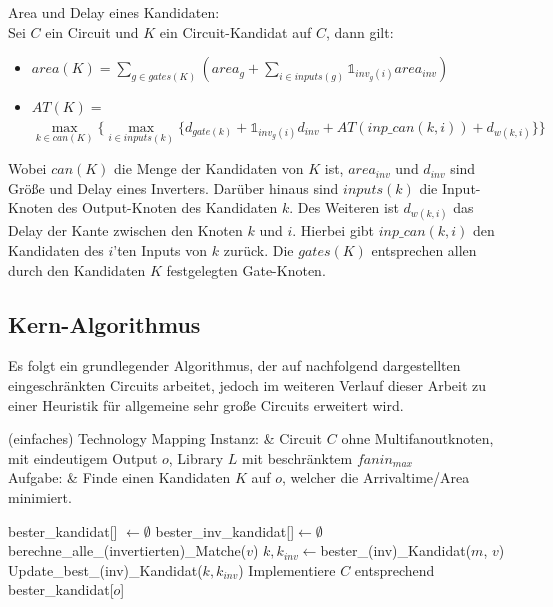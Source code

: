 \documentclass[11pt, a4paper, german]{article}
\begin{document}
\begin{definition}{Area und Delay eines Kandidaten:}\\
\label{def:area_delay}
Sei $C$ ein Circuit und $K$ ein Circuit-Kandidat auf $C$, dann gilt: \\
\begin{itemize}
\item $area(K) = \sum_{g \in gates(K)} (area_g + \sum_{i \in inputs(g)} \mathbb{1}_{inv_g(i)} area_{inv})$ 
\item $AT(K) = $\\$  \max\limits_{k \in can(K)} \{\max\limits_{i \in inputs(k)} \{   d_{gate(k)} + \mathbb{1}_{inv_g(i)} d_{inv} + AT(inp\_can(k,i)) + d_{w(k,i)} \} \}$ 
\end{itemize}
Wobei $can(K)$ die Menge der Kandidaten von $K$ ist, $area_{inv}$ und $d_{inv}$ sind Größe und Delay eines Inverters. Darüber hinaus sind $inputs(k)$ die Input-Knoten des Output-Knoten des Kandidaten $k$. Des Weiteren ist $d_{w(k,i)} $ das Delay der Kante zwischen den Knoten $k$ und $i$. Hierbei gibt $inp\_can(k,i)$ den Kandidaten des $i$'ten Inputs von $k$ zurück. 
Die $gates(K)$ entsprechen allen durch den Kandidaten $K$ festgelegten Gate-Knoten. 

\end{definition}

\subsection{Kern-Algorithmus}
\label{subsec:kern_algorithmus}

Es folgt ein grundlegender Algorithmus, der auf nachfolgend dargestellten eingeschränkten Circuits arbeitet, jedoch im weiteren Verlauf dieser Arbeit zu einer Heuristik für allgemeine sehr große Circuits erweitert wird.

\begin{problem}[framed]{(einfaches) Technology Mapping}
  Instanz:  & Circuit $C$ ohne Multifanoutknoten, mit eindeutigem Output $o$, Library $L$ mit beschr\"anktem $fanin_{max}$\\
  Aufgabe: &  Finde einen Kandidaten $K$ auf $o$, welcher die Arrivaltime/Area minimiert.
\end{problem}
\begin{algorithm}[H]
 \LinesNumbered
 \DontPrintSemicolon
 \caption{(einfaches) Technology Mapping}

 bester\_kandidat[] $\gets \emptyset$\;
 bester\_inv\_kandidat[]$ \gets \emptyset$\;
 {
   berechne\_alle\_(invertierten)\_Matche($v$)\;
   {
      $k,k_{inv} \gets $bester\_(inv)\_Kandidat($m$, $v$)\;
      Update\_best\_(inv)\_Kandidat($k,k_{inv}$)\;
   }
 }
 Implementiere $C$ entsprechend bester\_kandidat[$o$]\;
\end{algorithm}\ \\
\end{document}
